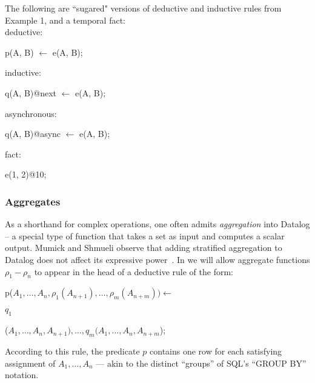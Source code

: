
\begin{example}
The following are ``sugared" versions of deductive and inductive rules from Example 1, and a temporal fact:
\\
deductive:
\begin{Dedalus}
p(A, B) \(\leftarrow\) e(A, B);
\end{Dedalus}
inductive:
\begin{Dedalus}
q(A, B)@next \(\leftarrow\) e(A, B);
\end{Dedalus}
asynchronous:
\begin{Dedalus}
q(A, B)@async \(\leftarrow\) e(A, B);
\end{Dedalus}
fact:
\begin{Dedalus}
e(1, 2)@10;
\end{Dedalus}

\end{example}

\subsubsection{Aggregates}
As a shorthand for complex operations, one often admits {\em aggregation} into Datalog -- a special type of function that takes a set as input and computes a scalar output.  Mumick and Shmueli observe that adding stratified aggregation to Datalog does not affect its expressive power~\cite{mumickshmueli}.  In \lang we will allow aggregate functions $\rho_1 - \rho_n$ to appear in the head of a deductive rule of the form:

\begin{dedalus}
p($A_1, \ldots, A_n, \rho_1(A_{n+1}), \ldots, \rho_m(A_{n+m})) \leftarrow$
\end{dedalus}

\hspace{5mm}
$q_1$
\begin{dedalus}
($A_1, \ldots, A_{n}, A_{n+1}), \ldots, q_m(A_1, \ldots, A_{n}, A_{n+m}$);
\end{dedalus}

According to this rule, the predicate $p$ contains one row for each satisfying assignment of $A_1, \ldots, A_n$ --- akin to the distinct ``groups'' of SQL's ``GROUP BY'' notation.

